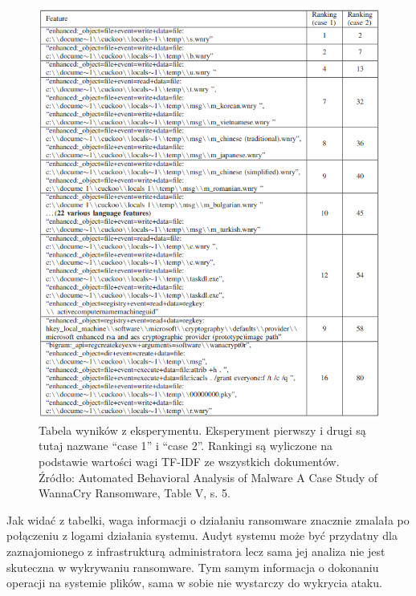 \begin{figure}[H]
    \centering
    \includegraphics[width=0.85\linewidth]{rysunki/failed-exp.png}
    \caption{Tabela wyników z eksperymentu. Eksperyment pierwszy i drugi są tutaj nazwane \foreignquote{english}{case 1} i \foreignquote{english}{case 2}.
    Rankingi są wyliczone na podstawie wartości wagi TF-IDF ze wszystkich dokumentów. Źródło: 
    Automated Behavioral Analysis of Malware
A Case Study of WannaCry Ransomware, Table V, s. 5.}
    \label{fig:enter-label}
\end{figure}
Jak widać z tabelki, waga informacji o działaniu ransomware znacznie zmalała po połączeniu
z logami działania systemu. Audyt systemu może być przydatny dla zaznajomionego z infrastrukturą
administratora lecz sama jej analiza nie jest skuteczna w wykrywaniu ransomware. Tym samym
informacja o dokonaniu operacji na systemie plików, sama w sobie nie wystarczy do wykrycia ataku.

